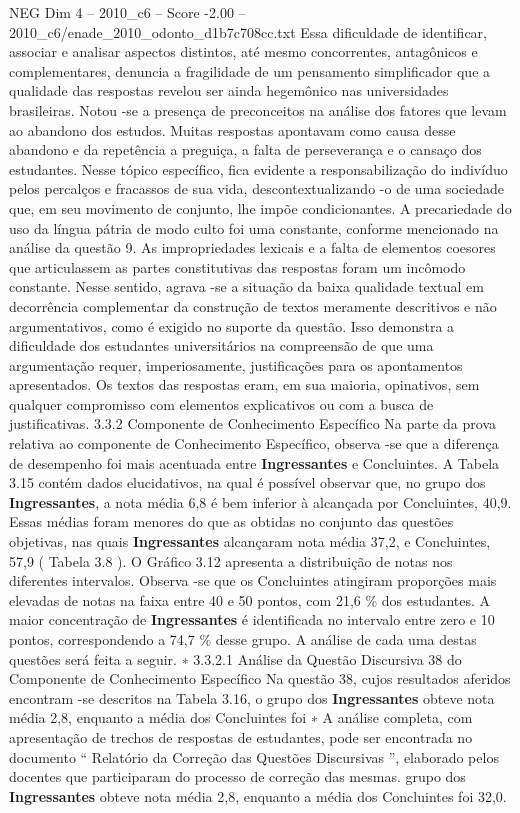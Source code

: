 \begin{textsample}{NEG Dim 4 – 2010\_c6 – Score -2.00 – 2010\_c6/enade\_2010\_odonto\_d1b7c708cc.txt}
Essa dificuldade de identificar, associar e analisar aspectos distintos, até mesmo concorrentes, antagônicos e complementares, denuncia a fragilidade de um pensamento simplificador que a qualidade das respostas revelou ser ainda hegemônico nas universidades brasileiras.
Notou -se a presença de preconceitos na análise dos fatores que levam ao abandono dos estudos.
Muitas respostas apontavam como causa desse abandono e da repetência a preguiça, a falta de perseverança e o cansaço dos estudantes.
Nesse tópico específico, fica evidente a responsabilização do indivíduo pelos percalços e fracassos de sua vida, descontextualizando -o de uma sociedade que, em seu movimento de conjunto, lhe impõe condicionantes.
A precariedade do uso da língua pátria de modo culto foi uma constante, conforme mencionado na análise da questão 9.
As impropriedades lexicais e a falta de elementos coesores que articulassem as partes constitutivas das respostas foram um incômodo constante.
Nesse sentido, agrava -se a situação da baixa qualidade textual em decorrência complementar da construção de textos meramente descritivos e não argumentativos, como é exigido no suporte da questão.
Isso demonstra a dificuldade dos estudantes universitários na compreensão de que uma argumentação requer, imperiosamente, justificações para os apontamentos apresentados.
Os textos das respostas eram, em sua maioria, opinativos, sem qualquer compromisso com elementos explicativos ou com a busca de justificativas. 3.3.2 Componente de Conhecimento Específico Na parte da prova relativa ao componente de Conhecimento Específico, observa -se que a diferença de desempenho foi mais acentuada entre \textbf{Ingressantes} e Concluintes.
A Tabela 3.15 contém dados elucidativos, na qual é possível observar que, no grupo dos \textbf{Ingressantes}, a nota média 6,8 é bem inferior à alcançada por Concluintes, 40,9.
Essas médias foram menores do que as obtidas no conjunto das questões objetivas, nas quais \textbf{Ingressantes} alcançaram nota média 37,2, e Concluintes, 57,9 ( Tabela 3.8 ).
O Gráfico 3.12 apresenta a distribuição de notas nos diferentes intervalos.
Observa -se que os Concluintes atingiram proporções mais elevadas de notas na faixa entre 40 e 50 pontos, com 21,6 \% dos estudantes.
A maior concentração de \textbf{Ingressantes} é identificada no intervalo entre zero e 10 pontos, correspondendo a 74,7 \% desse grupo.
A análise de cada uma destas questões será feita a seguir. ∗ 3.3.2.1 Análise da Questão Discursiva 38 do Componente de Conhecimento Específico Na questão 38, cujos resultados aferidos encontram -se descritos na Tabela 3.16, o grupo dos \textbf{Ingressantes} obteve nota média 2,8, enquanto a média dos Concluintes foi ∗ A análise completa, com apresentação de trechos de respostas de estudantes, pode ser encontrada no documento “ Relatório da Correção das Questões Discursivas ”, elaborado pelos docentes que participaram do processo de correção das mesmas. grupo dos \textbf{Ingressantes} obteve nota média 2,8, enquanto a média dos Concluintes foi 32,0.

\end{textsample}
